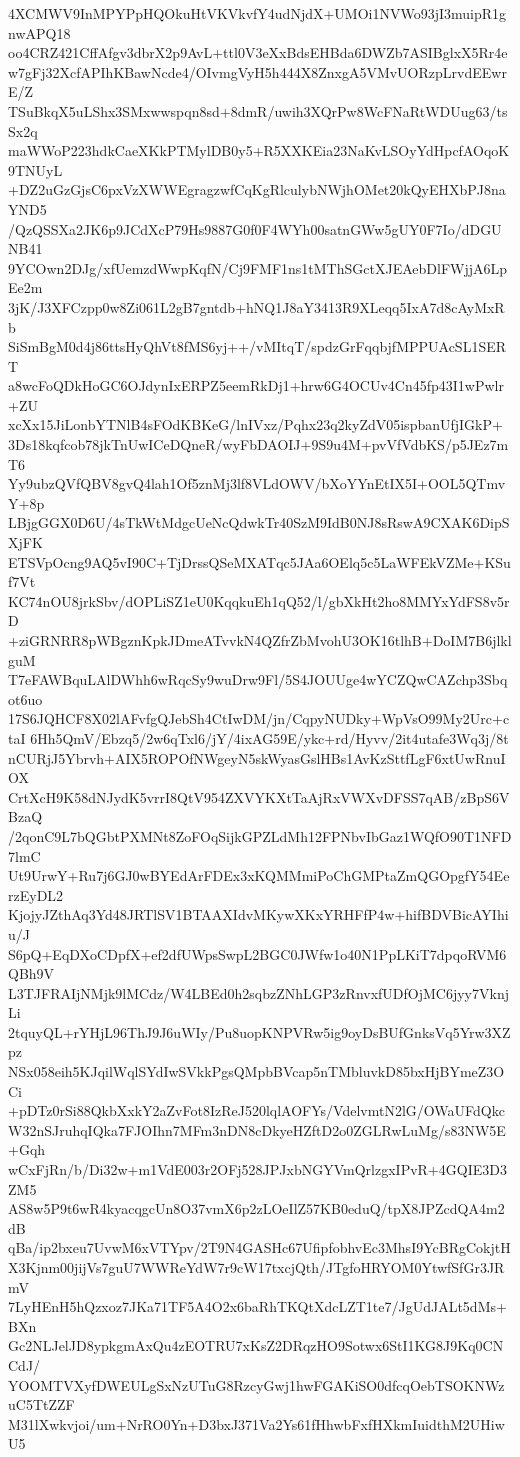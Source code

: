 4XCMWV9InMPYPpHQOkuHtVKVkvfY4udNjdX+UMOi1NVWo93jI3muipR1gnwAPQ18
oo4CRZ421CffAfgv3dbrX2p9AvL+ttl0V3eXxBdsEHBda6DWZb7ASIBglxX5Rr4e
w7gFj32XcfAPIhKBawNcde4/OIvmgVyH5h444X8ZnxgA5VMvUORzpLrvdEEwrE/Z
TSuBkqX5uLShx3SMxwwspqn8sd+8dmR/uwih3XQrPw8WcFNaRtWDUug63/tsSx2q
maWWoP223hdkCaeXKkPTMylDB0y5+R5XXKEia23NaKvLSOyYdHpcfAOqoK9TNUyL
+DZ2uGzGjsC6pxVzXWWEgragzwfCqKgRlculybNWjhOMet20kQyEHXbPJ8naYND5
/QzQSSXa2JK6p9JCdXcP79Hs9887G0f0F4WYh00satnGWw5gUY0F7Io/dDGUNB41
9YCOwn2DJg/xfUemzdWwpKqfN/Cj9FMF1ns1tMThSGctXJEAebDlFWjjA6LpEe2m
3jK/J3XFCzpp0w8Zi061L2gB7gntdb+hNQ1J8aY3413R9XLeqq5IxA7d8cAyMxRb
SiSmBgM0d4j86ttsHyQhVt8fMS6yj++/vMItqT/spdzGrFqqbjfMPPUAcSL1SERT
a8wcFoQDkHoGC6OJdynIxERPZ5eemRkDj1+hrw6G4OCUv4Cn45fp43I1wPwlr+ZU
xcXx15JiLonbYTNlB4sFOdKBKeG/lnIVxz/Pqhx23q2kyZdV05ispbanUfjIGkP+
3Ds18kqfcob78jkTnUwICeDQneR/wyFbDAOIJ+9S9u4M+pvVfVdbKS/p5JEz7mT6
Yy9ubzQVfQBV8gvQ4lah1Of5znMj3lf8VLdOWV/bXoYYnEtIX5I+OOL5QTmvY+8p
LBjgGGX0D6U/4sTkWtMdgcUeNcQdwkTr40SzM9IdB0NJ8sRswA9CXAK6DipSXjFK
ETSVpOcng9AQ5vI90C+TjDrssQSeMXATqc5JAa6OElq5c5LaWFEkVZMe+KSuf7Vt
KC74nOU8jrkSbv/dOPLiSZ1eU0KqqkuEh1qQ52/l/gbXkHt2ho8MMYxYdFS8v5rD
+ziGRNRR8pWBgznKpkJDmeATvvkN4QZfrZbMvohU3OK16tlhB+DoIM7B6jlklguM
T7eFAWBquLAlDWhh6wRqcSy9wuDrw9Fl/5S4JOUUge4wYCZQwCAZchp3Sbqot6uo
17S6JQHCF8X02lAFvfgQJebSh4CtIwDM/jn/CqpyNUDky+WpVsO99My2Urc+ctaI
6Hh5QmV/Ebzq5/2w6qTxl6/jY/4ixAG59E/ykc+rd/Hyvv/2it4utafe3Wq3j/8t
nCURjJ5Ybrvh+AIX5ROPOfNWgeyN5skWyasGslHBs1AvKzSttfLgF6xtUwRnuIOX
CrtXcH9K58dNJydK5vrrI8QtV954ZXVYKXtTaAjRxVWXvDFSS7qAB/zBpS6VBzaQ
/2qonC9L7bQGbtPXMNt8ZoFOqSijkGPZLdMh12FPNbvIbGaz1WQfO90T1NFD7lmC
Ut9UrwY+Ru7j6GJ0wBYEdArFDEx3xKQMMmiPoChGMPtaZmQGOpgfY54EerzEyDL2
KjojyJZthAq3Yd48JRTlSV1BTAAXIdvMKywXKxYRHFfP4w+hifBDVBicAYIhiu/J
S6pQ+EqDXoCDpfX+ef2dfUWpsSwpL2BGC0JWfw1o40N1PpLKiT7dpqoRVM6QBh9V
L3TJFRAIjNMjk9lMCdz/W4LBEd0h2sqbzZNhLGP3zRnvxfUDfOjMC6jyy7VknjLi
2tquyQL+rYHjL96ThJ9J6uWIy/Pu8uopKNPVRw5ig9oyDsBUfGnksVq5Yrw3XZpz
NSx058eih5KJqilWqlSYdIwSVkkPgsQMpbBVcap5nTMbluvkD85bxHjBYmeZ3OCi
+pDTz0rSi88QkbXxkY2aZvFot8IzReJ520lqlAOFYs/VdelvmtN2lG/OWaUFdQkc
W32nSJruhqIQka7FJOIhn7MFm3nDN8cDkyeHZftD2o0ZGLRwLuMg/s83NW5E+Gqh
wCxFjRn/b/Di32w+m1VdE003r2OFj528JPJxbNGYVmQrlzgxIPvR+4GQIE3D3ZM5
AS8w5P9t6wR4kyacqgcUn8O37vmX6p2zLOeIlZ57KB0eduQ/tpX8JPZcdQA4m2dB
qBa/ip2bxeu7UvwM6xVTYpv/2T9N4GASHc67UfipfobhvEc3MhsI9YcBRgCokjtH
X3Kjnm00jijVs7guU7WWReYdW7r9cW17txcjQth/JTgfoHRYOM0YtwfSfGr3JRmV
7LyHEnH5hQzxoz7JKa71TF5A4O2x6baRhTKQtXdcLZT1te7/JgUdJALt5dMs+BXn
Gc2NLJelJD8ypkgmAxQu4zEOTRU7xKsZ2DRqzHO9Sotwx6StI1KG8J9Kq0CNCdJ/
YOOMTVXyfDWEULgSxNzUTuG8RzcyGwj1hwFGAKiSO0dfcqOebTSOKNWzuC5TtZZF
M31lXwkvjoi/um+NrRO0Yn+D3bxJ371Va2Ys61fHhwbFxfHXkmIuidthM2UHiwU5

